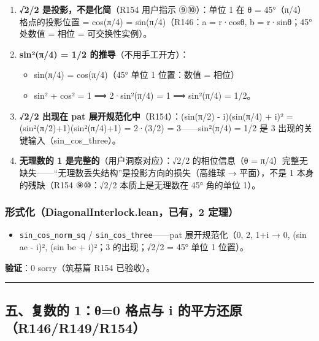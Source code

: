 \documentclass[
]{article}
\providecommand{\tightlist}{%
  \setlength{\itemsep}{0pt}\setlength{\parskip}{0pt}}
\begin{document}
\begin{enumerate}
\def\labelenumi{\arabic{enumi}.}
\tightlist
\item
  \textbf{√2/2 是投影，不是化简}（R154 用户指示 ⑨⑩）：单位 1 在 θ =
  45°（π/4）格点的投影位置 = cos(π/4) = sin(π/4)（R146：a = r·cosθ, b =
  r·sinθ；45° 处数值 = 相位 = 可交换性实例）。
\item
  \textbf{sin²(π/4) = 1/2 的推导}（不用手工开方）：

  \begin{itemize}
  \tightlist
  \item
    sin(π/4) = cos(π/4)（45° 单位 1 位置：数值 = 相位）
  \item
    sin² + cos² = 1 ⟹ 2·sin²(π/4) = 1 ⟹ sin²(π/4) = 1/2。
  \end{itemize}
\item
  \textbf{√2/2 出现在 pat 展开规范化中}（R154）：\textbar(sin(π/2) -
  i)(sin(π/4) + i)\textbar² = (sin²(π/2)+1)(sin²(π/4)+1) = 2·(3/2) =
  3------sin²(π/4) = 1/2 是 3 出现的关键输入（sin\_cos\_three）。
\item
  \textbf{无理数的 1 是完整的}（用户洞察对应）：√2/2 的相位信息（θ =
  π/4）完整无缺失------``无理数丢失结构''是投影方向的损失（高维球 →
  平面），不是 1 本身的残缺（R154 ⑨⑩：√2/2 本质上是无理数在 45° 角的单位
  1）。
\end{enumerate}

\subsubsection{形式化（DiagonalInterlock.lean，已有，2
定理）}\label{ux5f62ux5f0fux5316diagonalinterlock.leanux5df2ux67092-ux5b9aux7406}

\begin{itemize}
\tightlist
\item
  \texttt{sin\_cos\_norm\_sq} / \texttt{sin\_cos\_three}------pat
  展开规范化（0, 2, 1+i → 0, (sin ae - i)², (sin be + i)²；3
  的出现；√2/2 = 45° 单位 1 位置）。
\end{itemize}

\textbf{验证}：0 sorry（筑基篇 R154 已验收）。

\begin{center}\rule{0.5\linewidth}{0.5pt}\end{center}

\subsection{五、复数的 1：θ=0 格点与 i
的平方还原（R146/R149/R154）}\label{ux4e94ux590dux6570ux7684-1ux3b80-ux683cux70b9ux4e0e-i-ux7684ux5e73ux65b9ux8fd8ux539fr146r149r154}
\end{document}
